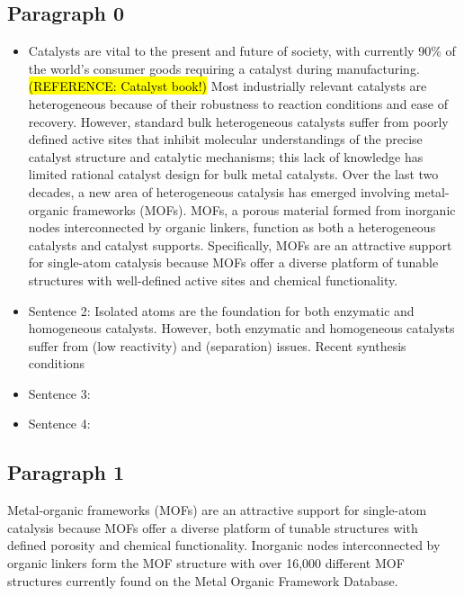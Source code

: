 \documentclass[journal=jctcce,manuscript=article]{achemso}
\begin{document}
\subsection{Paragraph 0}



\begin{itemize}
    \item Catalysts are vital to the present and future of society, with currently 90\% of the world's consumer goods requiring a catalyst during manufacturing.\hl{(REFERENCE: Catalyst book!)}  Most industrially relevant catalysts are heterogeneous because of their robustness to reaction conditions and ease of recovery. However, standard bulk heterogeneous catalysts suffer from poorly defined active sites that inhibit molecular understandings of the precise catalyst structure and catalytic mechanisms; this lack of knowledge has limited rational catalyst design for bulk metal catalysts.  Over the last two decades, a new area of heterogeneous catalysis has emerged involving metal-organic frameworks (MOFs). MOFs, a porous material formed from inorganic nodes interconnected by organic linkers, function as both a heterogeneous catalysts and catalyst supports. Specifically, MOFs are an attractive support for single-atom catalysis because MOFs offer a diverse platform of tunable structures with well-defined active sites and chemical functionality.
  
  
    
    \item Sentence 2: Isolated atoms are the foundation for both enzymatic and homogeneous catalysts. However, both enzymatic and homogeneous catalysts suffer from (low reactivity) and (separation) issues. Recent synthesis conditions 
    \item Sentence 3:
    \item Sentence 4:
\end{itemize}

\subsection{Paragraph 1}
Metal-organic frameworks (MOFs) are an attractive support for single-atom catalysis because MOFs offer a diverse platform of tunable structures with defined porosity and chemical functionality. Inorganic nodes interconnected by organic linkers form the MOF structure with over 16,000 different MOF structures currently found on the Metal Organic Framework Database. 
\end{document}
